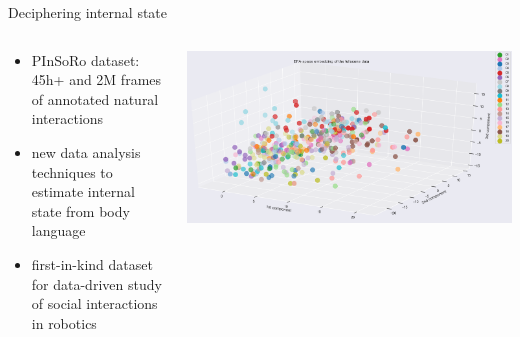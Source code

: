 \documentclass[xcolor=table]{beamer}
\begin{document}
{\begin{frame}{Deciphering internal state}
\begin{columns}
\begin{column}{0.5\linewidth}
        \end{column}
    \end{columns}
    \vspace{0.5cm}
\begin{columns}
    \begin{column}{0.5\linewidth}
        {\scriptsize
        \begin{itemize}
            \item PInSoRo dataset: 45h+ and 2M frames of annotated natural interactions
            \item new data analysis techniques to estimate internal state from body language
            \item first-in-kind dataset for data-driven study of social
                interactions in robotics
        \end{itemize}
        }
    \end{column}
    \begin{column}{0.5\linewidth}
            \includegraphics[trim=1cm 0 4cm 0,clip,width=\columnwidth]{kinematics_social_dynamics/efa-embeddings.png}
    \end{column}
\end{columns}

\end{frame}
}






\end{document}
